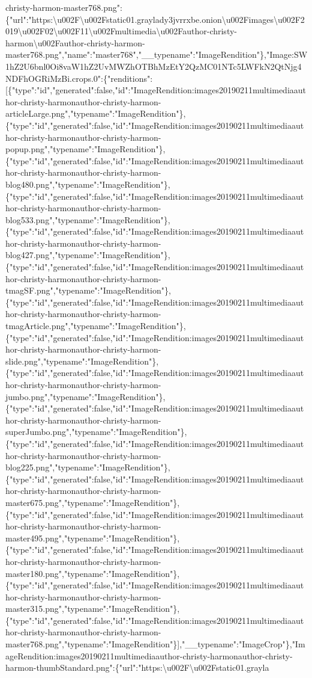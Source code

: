christy-harmon-master768.png":\{"url":"https:\textbackslash{}u002F\textbackslash{}u002Fstatic01.graylady3jvrrxbe.onion\textbackslash{}u002Fimages\textbackslash{}u002F2019\textbackslash{}u002F02\textbackslash{}u002F11\textbackslash{}u002Fmultimedia\textbackslash{}u002Fauthor-christy-harmon\textbackslash{}u002Fauthor-christy-harmon-master768.png","name":"master768","\_\_typename":"ImageRendition"\},"Image:SW1hZ2U6bnl0Oi8vaW1hZ2UvMWZhOTBhMzEtY2QzMC01NTc5LWFkN2QtNjg4NDFhOGRiMzBi.crops.0":\{"renditions":{[}\{"type":"id","generated":false,"id":"ImageRendition:images20190211multimediaauthor-christy-harmonauthor-christy-harmon-articleLarge.png","typename":"ImageRendition"\},\{"type":"id","generated":false,"id":"ImageRendition:images20190211multimediaauthor-christy-harmonauthor-christy-harmon-popup.png","typename":"ImageRendition"\},\{"type":"id","generated":false,"id":"ImageRendition:images20190211multimediaauthor-christy-harmonauthor-christy-harmon-blog480.png","typename":"ImageRendition"\},\{"type":"id","generated":false,"id":"ImageRendition:images20190211multimediaauthor-christy-harmonauthor-christy-harmon-blog533.png","typename":"ImageRendition"\},\{"type":"id","generated":false,"id":"ImageRendition:images20190211multimediaauthor-christy-harmonauthor-christy-harmon-blog427.png","typename":"ImageRendition"\},\{"type":"id","generated":false,"id":"ImageRendition:images20190211multimediaauthor-christy-harmonauthor-christy-harmon-tmagSF.png","typename":"ImageRendition"\},\{"type":"id","generated":false,"id":"ImageRendition:images20190211multimediaauthor-christy-harmonauthor-christy-harmon-tmagArticle.png","typename":"ImageRendition"\},\{"type":"id","generated":false,"id":"ImageRendition:images20190211multimediaauthor-christy-harmonauthor-christy-harmon-slide.png","typename":"ImageRendition"\},\{"type":"id","generated":false,"id":"ImageRendition:images20190211multimediaauthor-christy-harmonauthor-christy-harmon-jumbo.png","typename":"ImageRendition"\},\{"type":"id","generated":false,"id":"ImageRendition:images20190211multimediaauthor-christy-harmonauthor-christy-harmon-superJumbo.png","typename":"ImageRendition"\},\{"type":"id","generated":false,"id":"ImageRendition:images20190211multimediaauthor-christy-harmonauthor-christy-harmon-blog225.png","typename":"ImageRendition"\},\{"type":"id","generated":false,"id":"ImageRendition:images20190211multimediaauthor-christy-harmonauthor-christy-harmon-master675.png","typename":"ImageRendition"\},\{"type":"id","generated":false,"id":"ImageRendition:images20190211multimediaauthor-christy-harmonauthor-christy-harmon-master495.png","typename":"ImageRendition"\},\{"type":"id","generated":false,"id":"ImageRendition:images20190211multimediaauthor-christy-harmonauthor-christy-harmon-master180.png","typename":"ImageRendition"\},\{"type":"id","generated":false,"id":"ImageRendition:images20190211multimediaauthor-christy-harmonauthor-christy-harmon-master315.png","typename":"ImageRendition"\},\{"type":"id","generated":false,"id":"ImageRendition:images20190211multimediaauthor-christy-harmonauthor-christy-harmon-master768.png","typename":"ImageRendition"\}{]},"\_\_typename":"ImageCrop"\},"ImageRendition:images20190211multimediaauthor-christy-harmonauthor-christy-harmon-thumbStandard.png":\{"url":"https:\textbackslash{}u002F\textbackslash{}u002Fstatic01.grayla